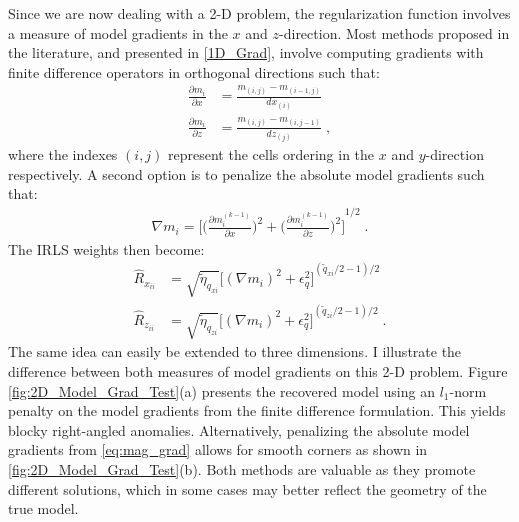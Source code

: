 Since we are now dealing with a 2-D problem, the regularization function involves a measure of model gradients in the $x$ and $z$-direction.
Most methods proposed in the literature, and presented in \ref{1D_Grad}, involve computing gradients with finite difference operators in orthogonal directions such that:
\begin{equation}\label{eq:grad}
\begin{split}
 	\frac{\partial m_i}{\partial x} &= \frac{m_{(i,j)} - m_{(i-1,j)}}{dx_{(i)}} \\
 	\frac{\partial m_i}{\partial z}  &= \frac{m_{(i,j)} - m_{(i,j-1)}}{dz_{(j)}}\;,
 	\end{split}
\end{equation}
where the indexes $(i,j)$ represent the cells ordering in the $x$ and $y$-direction respectively.
A second option is to penalize the absolute model gradients such that:
\begin{equation}\label{eq:mag_grad}
\begin{split}
	\nabla {m}_i  =  {\Big[ \big(\frac{\partial m_i^{(k-1)} }{\partial x}\big)^2 + \big(\frac{\partial m_i^{(k-1)} }{\partial z} \big)^2 \Big] }^{1/2}\;.
\end{split}
\end{equation}
The IRLS weights then become:
 \begin{equation}
 \begin{split}
 {\hat R}_{x_{ii}}  &= \sqrt{\tilde \eta_{q_{xi}}}{\Big[ {\left ({\nabla m_i}\right)}^{2} + \epsilon_q^2 \Big]}^{({\tilde q_{xi}}/2 - 1)/2}  \\
{\hat R}_{z_{ii}}  &= \sqrt{\tilde \eta_{q_{zi}}}{\Big[ {\left ({\nabla m_i}\right)}^{2} + \epsilon_q^2 \Big]}^{({\tilde q_{zi}}/2 - 1)/2}  \;.
   \end{split}
\end{equation}
The same idea can easily be extended to three dimensions.
I illustrate the difference between both measures of model gradients on this 2-D problem. Figure \ref{fig:2D_Model_Grad_Test}(a) presents the recovered model using an $l_1$-norm penalty on the model gradients from the finite difference formulation. This yields blocky right-angled anomalies. Alternatively, penalizing the absolute model gradients from \eqref{eq:mag_grad}  allows for smooth corners as shown in \ref{fig:2D_Model_Grad_Test}(b). Both methods are valuable as they promote different solutions, which in some cases may better reflect the geometry of the true model. 


